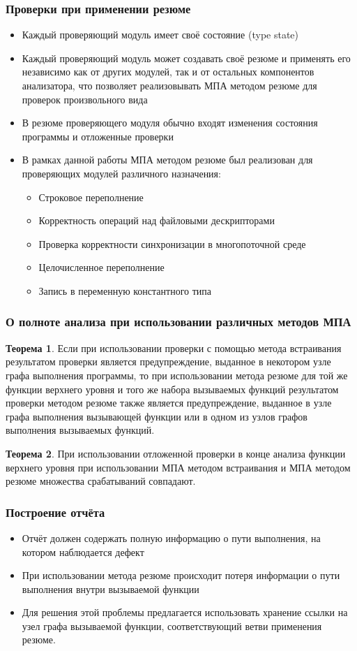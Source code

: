 \documentclass[hyperref={pdfpagelabels=false}]{beamer}
\begin{document}
\begin{frame}[allowframebreaks]
\frametitle{Проверки при применении резюме}
\begin{itemize}
  \item Каждый проверяющий модуль имеет своё состояние (type state)
  \item Каждый проверяющий модуль может создавать своё резюме и применять его независимо как от других модулей, так и от остальных компонентов анализатора, что позволяет реализовывать МПА методом резюме для проверок произвольного вида
  \item В резюме проверяющего модуля обычно входят изменения состояния программы и отложенные проверки
  \item В рамках данной работы МПА методом резюме был реализован для проверяющих модулей различного назначения:
    \begin{itemize}
    \item Строковое переполнение
    \item Корректность операций над файловыми дескрипторами
    \item Проверка корректности синхронизации в многопоточной среде
    \item Целочисленное переполнение
    \item Запись в переменную константного типа
  \end{itemize}
\end{itemize}
\end{frame}

\begin{frame}[allowframebreaks]
\frametitle{О полноте анализа при использовании различных методов МПА}
\textbf{Теорема 1}. Если при использовании проверки с помощью метода встраивания результатом проверки является предупреждение, выданное в некотором узле графа выполнения программы, то при использовании метода резюме для той же функции верхнего уровня и того же набора вызываемых функций результатом проверки методом резюме также является предупреждение, выданное в узле графа выполнения вызывающей функции или в одном из узлов графов выполнения вызываемых функций.

\textbf{Теорема 2}. При использовании отложенной проверки в конце анализа функции верхнего уровня при использовании МПА методом встраивания и МПА методом резюме множества срабатываний совпадают.
\end{frame}

\begin{frame}
\frametitle{Построение отчёта}
\begin{itemize}
  \item Отчёт должен содержать полную информацию о пути выполнения, на котором наблюдается дефект
  \item При использовании метода резюме происходит потеря информации о пути выполнения внутри вызываемой функции
  \item Для решения этой проблемы предлагается использовать хранение ссылки на узел графа вызываемой функции, соответствующий ветви применения резюме.
\end{itemize}
\end{frame}
\end{document}
